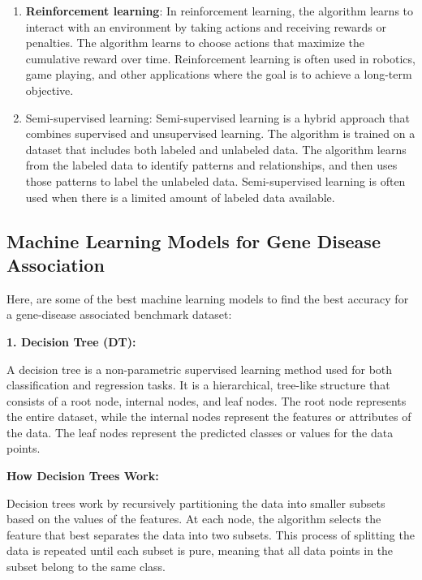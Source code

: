 \begin{enumerate}
\begin{itemize}
\end{itemize}

    \item \textbf{Reinforcement learning}: In reinforcement learning, the algorithm learns to interact with an environment by taking actions and receiving rewards or penalties. The algorithm learns to choose actions that maximize the cumulative reward over time. Reinforcement learning is often used in robotics, game playing, and other applications where the goal is to achieve a long-term objective.

    \item Semi-supervised learning: Semi-supervised learning is a hybrid approach that combines supervised and unsupervised learning. The algorithm is trained on a dataset that includes both labeled and unlabeled data. The algorithm learns from the labeled data to identify patterns and relationships, and then uses those patterns to label the unlabeled data. Semi-supervised learning is often used when there is a limited amount of labeled data available.
\end{enumerate}
 
\subsection{Machine Learning Models for Gene Disease Association}

Here, are some of the best machine learning models to find the best accuracy for a gene-disease associated benchmark dataset:

\textbf{1. Decision Tree (DT):}

A decision tree is a non-parametric supervised learning method used for both classification and regression tasks. It is a hierarchical, tree-like structure that consists of a root node, internal nodes, and leaf nodes. The root node represents the entire dataset, while the internal nodes represent the features or attributes of the data. The leaf nodes represent the predicted classes or values for the data points.

\textbf{How Decision Trees Work:}

Decision trees work by recursively partitioning the data into smaller subsets based on the values of the features. At each node, the algorithm selects the feature that best separates the data into two subsets. This process of splitting the data is repeated until each subset is pure, meaning that all data points in the subset belong to the same class.

